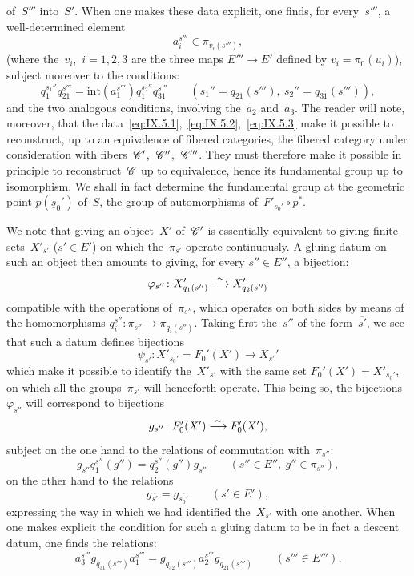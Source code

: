 of~$S'''$ into~$S'$. When one makes these data explicit, one finds,
for every~$s'''$, a well-determined element
\begin{equation*}
\label{eq:IX.5.3}
\tag{3} {a_i^{s'''}\in\pi_{v_i(s''')},}
\end{equation*}
(where the~$v_i$,~$i=1,2,3$ are the three maps $E'''\to E'$
defined by $v_i=\pi_0(u_i)$), subject moreover to the conditions:
$$
q_1^{s_1''}q_{21}^{s'''}=\mathrm{int}(a_1^{s'''})
q_1^{s_2''}q_{31}^{s'''}\qquad (s_1''=q_{21}(s'''),\
s_2''=q_{31}(s''')),
$$
and the two analogous conditions, involving the~$a_2$ and~$a_3$. The
reader will note, moreover, that the
data~\eqref{eq:IX.5.1},~\eqref{eq:IX.5.2},~\eqref{eq:IX.5.3} make it
possible to reconstruct, up to an equivalence of fibered categories,
the fibered category under consideration with
fibers~$\cal{C}'$,~$\cal{C}''$,~$\cal{C}'''$. They must therefore
make it possible in principle to reconstruct~$\cal{C}$ up to
equivalence, hence its fundamental group up to isomorphism. We shall
in fact determine the fundamental group at the geometric point
$p(\underline{s}_0')$ of~$S$, \ie the group of automorphisms
of~$F'_{s_0'}\circ p^*$.

We note that giving an object~$X'$ of~$\cal{C}'$ is essentially
equivalent to giving finite sets~$X'_{s'}$ ($s'\in E'$) on which
the~$\pi_{s'}$ operate continuously. A
gluing datum on such an object then amounts to giving, for every
$s''\in E''$, a bijection:
$$
\varphi_{s''}\colon X'_{q_1(s'')}\overset{\sim}{\longrightarrow} X'_{q_2(s'')}
$$
compatible with the operations of~$\pi_{s''}$, which operates on
both sides by means of the homomorphisms $q_i^{s''}\colon
\pi_{s''}\to\pi_{q_i(s'')}$. Taking first the~$s''$ of the
form~$\overline{s'}$, we see that such a datum defines bijections
$$
\psi_{s'}\colon X'_{s_0'}=F_0'(X')\to X_{s'}'
$$
which make it possible to identify the~$X'_{s'}$ with the same set
$F_0'(X')=X'_{s_0'}$, on which all the groups~$\pi_{s'}$ will
henceforth operate. This being so, the bijections~$\varphi_{s''}$
will correspond to bijections
$$
g_{s''}\colon F_0'(X')\overset{\sim}{\longrightarrow} F_0'(X'),
$$
subject on the one hand to the relations of commutation
with~$\pi_{s''}$:
\begin{equation*}
\label{eq:IX.5.a}
\tag*{a)} {g_{s''}q_1^{s''}(g'')=q_2^{s''}(g'')g_{s''}\qquad (s''\in E'',\ g''\in\pi_{s''}),}
\end{equation*}
on the other hand to the relations
\begin{equation*}
\label{eq:IX.5.b}
\tag*{b)} {g_{\overline{s'}}=g_{\overline{s_0'}}\qquad (s'\in E'),}
\end{equation*}
expressing the way in which we had identified the~$X_{s'}$ with one
another. When one makes explicit the condition for such a gluing
datum to be in fact a descent datum, one finds the relations:
\begin{equation*}
\label{eq:IX.5.c}
\tag*{c)} {a_3^{s'''}g_{q_{31}(s''')}a_1^{s'''}=
g_{q_{32}(s''')}a_2^{s'''}g_{q_{21}(s''')}\qquad (s'''\in E''').}
\end{equation*}

